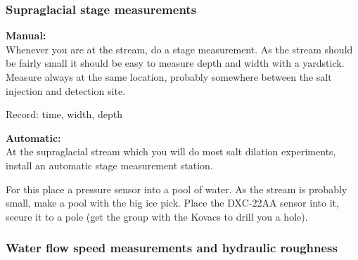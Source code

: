 \documentclass[DIV=15,halfparskip,11pt,headinclude]{scrartcl}
\begin{document}
\subsubsection{Supraglacial stage measurements}

\textbf{Manual:\\}
Whenever you are at the stream, do a stage measurement.  As the stream
should be fairly small it should be easy to measure depth and width
with a yardstick.  Measure always at the same location, probably
somewhere between the salt injection and detection site.

Record: time, width, depth

\textbf{Automatic:}\\
At the supraglacial stream which you will do most salt dilation
experiments, install an automatic stage measurement station.

For this place a pressure sensor into a pool of water.  As the stream
is probably small, make a pool with the big ice pick.  Place the
DXC-22AA sensor into it, secure it to a pole (get the group
with the Kovacs to drill you a hole).





\subsubsection{Water flow speed measurements and hydraulic roughness}
\end{document}
